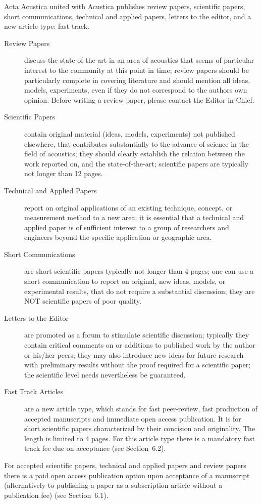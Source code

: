 \documentclass[twocolumn]{article}
\begin{document}
Acta Acustica united with Acustica publishes review papers, scientific
papers, short communications, technical and applied papers, letters
to the editor, and a new article type: fast track.
\begin{description}
\item[Review Papers] discuss the state-of-the-art in an area of
      acoustics that seems of particular interest to the community at
      this point in time; review papers should be particularly complete
      in covering literature and should mention all ideas, models,
      experiments, even if they do not correspond to the authors own
      opinion. Before writing a review paper, please contact the
      Editor-in-Chief.
\item[Scientific Papers] contain original material (ideas, models,
      experiments) not published elsewhere, that contributes
      substantially to the advance of science in the field of acoustics;
      they should clearly establish the relation between the work
      reported on, and the state-of-the-art; scientific papers are
      typically not longer than 12 pages.
\item[Technical and Applied Papers] report on original applications of
      an existing technique, concept, or measurement method to a new
      area; it is essential that a technical and applied paper is of
      sufficient interest to a group of researchers and engineers beyond
      the specific application or geographic area.
\item[Short Communications] are short scientific papers typically not
      longer than 4 pages; one can use a short communication to report
      on original, new ideas, models, or experimental results, that do
      not require a substantial discussion; they are NOT scientific
      papers of poor quality.
\item[Letters to the Editor] are promoted as a forum to stimulate
      scientific discussion; typically they contain critical comments on
      or additions to published work by the author or his/her peers;
      they may also introduce new ideas for future research with
      preliminary results without the proof required for a scientific
      paper; the scientific level needs nevertheless be guaranteed.
\item[Fast Track Articles] are a new article type, which stands for fast
      peer-review, fast production of accepted manu\-scripts and
      immediate open access publication. It is for short scientific
      papers characterized by their concision and originality. The
      length is limited to 4 pages. For this article type there is a
      mandatory fast track fee due on acceptance (see Section~6.2).
\end{description}
For accepted scientific papers, technical and applied papers and review
papers there is a paid open access publication option upon acceptance of
a manuscript (alternatively to publishing a paper as a subscription
article without a publication fee) (see Section~6.1).
\end{document}
